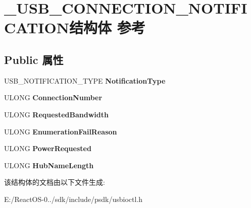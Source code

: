 \hypertarget{struct___u_s_b___c_o_n_n_e_c_t_i_o_n___n_o_t_i_f_i_c_a_t_i_o_n}{}\section{\+\_\+\+U\+S\+B\+\_\+\+C\+O\+N\+N\+E\+C\+T\+I\+O\+N\+\_\+\+N\+O\+T\+I\+F\+I\+C\+A\+T\+I\+O\+N结构体 参考}
\label{struct___u_s_b___c_o_n_n_e_c_t_i_o_n___n_o_t_i_f_i_c_a_t_i_o_n}
\subsection*{Public 属性}
\begin{DoxyCompactItemize}
\item 
\mbox{\label{struct___u_s_b___c_o_n_n_e_c_t_i_o_n___n_o_t_i_f_i_c_a_t_i_o_n_a15496dcfc5ab8c62d59c4c156f3eb6c2}} 
U\+S\+B\+\_\+\+N\+O\+T\+I\+F\+I\+C\+A\+T\+I\+O\+N\+\_\+\+T\+Y\+PE {\bfseries Notification\+Type}
\item 
\mbox{\label{struct___u_s_b___c_o_n_n_e_c_t_i_o_n___n_o_t_i_f_i_c_a_t_i_o_n_a78017a19f3f6db1ebb18787f9b1d0b82}} 
U\+L\+O\+NG {\bfseries Connection\+Number}
\item 
\mbox{\label{struct___u_s_b___c_o_n_n_e_c_t_i_o_n___n_o_t_i_f_i_c_a_t_i_o_n_aae70e7142ea173574fe3978a7b168f30}} 
U\+L\+O\+NG {\bfseries Requested\+Bandwidth}
\item 
\mbox{\label{struct___u_s_b___c_o_n_n_e_c_t_i_o_n___n_o_t_i_f_i_c_a_t_i_o_n_a8c00f618a52462d3b8605497b96443e0}} 
U\+L\+O\+NG {\bfseries Enumeration\+Fail\+Reason}
\item 
\mbox{\label{struct___u_s_b___c_o_n_n_e_c_t_i_o_n___n_o_t_i_f_i_c_a_t_i_o_n_ac5afd6f60552754600d34dd728e99f4f}} 
U\+L\+O\+NG {\bfseries Power\+Requested}
\item 
\mbox{\label{struct___u_s_b___c_o_n_n_e_c_t_i_o_n___n_o_t_i_f_i_c_a_t_i_o_n_a7e2aca9e146422ff14f06875b9f04868}} 
U\+L\+O\+NG {\bfseries Hub\+Name\+Length}
\end{DoxyCompactItemize}


该结构体的文档由以下文件生成\+:\begin{DoxyCompactItemize}
\item 
E\+:/\+React\+O\+S-\/0../sdk/include/psdk/usbioctl.\+h\end{DoxyCompactItemize}

